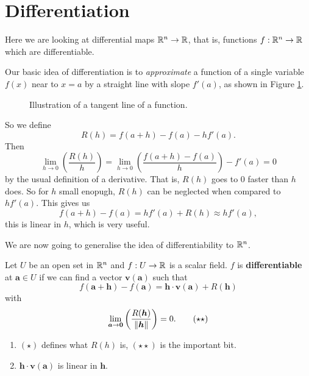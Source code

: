 \section{Differentiation}

Here we are looking at differential maps $\mathbb{R}^n \to \mathbb{R}$, that is, functions $f: \mathbb{R}^n \to \mathbb{R}$ which are differentiable.

Our basic idea of differentiation is to \emph{approximate} a function of a single variable $f(x)$ near to $x = a$ by a straight line with slope $f'(a)$, as shown in Figure \ref{fig:approximate-function}.

\begin{figure}
    \centering
    \caption{Illustration of a tangent line of a function.}
    \label{fig:approximate-function}
\end{figure}

So we define
\[ R(h) = f(a + h) - f(a) - hf'(a). \]
Then
\[ \lim_{h \to 0} \left( \frac{R(h)}{h} \right) = \lim_{h \to 0} \left(\frac{f(a + h) - f(a)}{h}\right) - f'(a) = 0 \]
by the usual definition of a derivative. That is, $R(h)$ goes to $0$ faster than $h$ does. So for $h$ small enopugh, $R(h)$ can be neglected when compared to $hf'(a)$. This gives us 
\[ f(a+h) - f(a) = hf'(a) + R(h) \approx hf'(a), \]
this is linear in $h$, which is very useful.

We are now going to generalise the idea of differentiability to $\mathbb{R}^n$.

\begin{definition}[Differentiability]
    Let $U$ be an open set in $\mathbb{R}^n$ and $f: U \to \mathbb{R}$ is a scalar field. $f$ is \textbf{differentiable} at $\bm a \in U$ if we can find a vector $\bm v(\bm a)$ such that
    \[ f(\bm a + \bm h) - f(\bm a) = \bm h \cdot \bm v(\bm a) + R(\bm h) \tag{$\star$} \]
    with 
    \[ \lim_{\bm a \to \bm 0} \left(\frac{R(\bm h)}{\left\lVert\bm h\right\rVert} \right) = 0. \tag{$\star\star$} \]
\end{definition}

\begin{remark}
    \begin{enumerate}
        \item $(\star)$ defines what $R(h)$ is, $(\star\star)$ is the important bit.
        \item $\bm h \cdot \bm v(\bm a)$ is linear in $\bm h$.
    \end{enumerate}
\end{remark}

